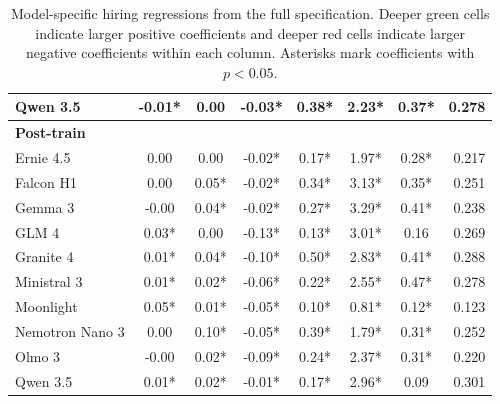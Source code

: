 \begin{table}[p]
\begin{tabular}{lccccccr}
Qwen 3.5 & \cellcolor[HTML]{FBE3E0}-0.01* & \cellcolor[HTML]{F4FCF8}0.00 & \cellcolor[HTML]{F9D6D2}-0.03* & \cellcolor[HTML]{60CE95}0.38* & \cellcolor[HTML]{71D3A0}2.23* & \cellcolor[HTML]{5ACC91}0.37* & 0.278 \\
\midrule
\multicolumn{8}{l}{\textbf{Post-train}} \\
Ernie 4.5 & \cellcolor[HTML]{F5FCF8}0.00 & \cellcolor[HTML]{F4FCF8}0.00 & \cellcolor[HTML]{FCE5E3}-0.02* & \cellcolor[HTML]{B7E9CF}0.17* & \cellcolor[HTML]{81D8AB}1.97* & \cellcolor[HTML]{80D7AA}0.28* & 0.217 \\
Falcon H1 & \cellcolor[HTML]{FDFEFE}0.00 & \cellcolor[HTML]{8ADBB1}0.05* & \cellcolor[HTML]{FADDDA}-0.02* & \cellcolor[HTML]{71D3A0}0.34* & \cellcolor[HTML]{38C17A}3.13* & \cellcolor[HTML]{61CE95}0.35* & 0.251 \\
Gemma 3 & \cellcolor[HTML]{FEF9F9}-0.00 & \cellcolor[HTML]{A4E3C2}0.04* & \cellcolor[HTML]{FADCD9}-0.02* & \cellcolor[HTML]{8DDCB3}0.27* & \cellcolor[HTML]{2EBE73}3.29* & \cellcolor[HTML]{48C684}0.41* & 0.238 \\
GLM 4 & \cellcolor[HTML]{A8E4C4}0.03* & \cellcolor[HTML]{FBFEFC}0.00 & \cellcolor[HTML]{E74C3C}-0.13* & \cellcolor[HTML]{C8EEDA}0.13* & \cellcolor[HTML]{40C37F}3.01* & \cellcolor[HTML]{B7E9CF}0.16 & 0.269 \\
Granite 4 & \cellcolor[HTML]{E3F6EC}0.01* & \cellcolor[HTML]{B2E7CB}0.04* & \cellcolor[HTML]{EC7165}-0.10* & \cellcolor[HTML]{2EBE73}0.50* & \cellcolor[HTML]{4BC787}2.83* & \cellcolor[HTML]{47C683}0.41* & 0.288 \\
Ministral 3 & \cellcolor[HTML]{D4F2E2}0.01* & \cellcolor[HTML]{DEF5E9}0.02* & \cellcolor[HTML]{F4ADA6}-0.06* & \cellcolor[HTML]{A3E2C1}0.22* & \cellcolor[HTML]{5DCD92}2.55* & \cellcolor[HTML]{2EBE73}0.47* & 0.278 \\
Moonlight & \cellcolor[HTML]{76D4A3}0.05* & \cellcolor[HTML]{ECF9F2}0.01* & \cellcolor[HTML]{F5B2AB}-0.05* & \cellcolor[HTML]{D4F2E2}0.10* & \cellcolor[HTML]{CBEFDC}0.81* & \cellcolor[HTML]{C8EEDA}0.12* & 0.123 \\
Nemotron Nano 3 & \cellcolor[HTML]{FBFEFD}0.00 & \cellcolor[HTML]{2EBE73}0.10* & \cellcolor[HTML]{F5B3AC}-0.05* & \cellcolor[HTML]{5ACC90}0.39* & \cellcolor[HTML]{8DDCB3}1.79* & \cellcolor[HTML]{76D4A3}0.31* & 0.252 \\
Olmo 3 & \cellcolor[HTML]{FFFCFC}-0.00 & \cellcolor[HTML]{CBEFDC}0.02* & \cellcolor[HTML]{ED7B70}-0.09* & \cellcolor[HTML]{99DFBB}0.24* & \cellcolor[HTML]{68D09A}2.37* & \cellcolor[HTML]{73D4A1}0.31* & 0.220 \\
Qwen 3.5 & \cellcolor[HTML]{D9F3E5}0.01* & \cellcolor[HTML]{DEF5E9}0.02* & \cellcolor[HTML]{FDEFED}-0.01* & \cellcolor[HTML]{B7E9CF}0.17* & \cellcolor[HTML]{43C481}2.96* & \cellcolor[HTML]{D7F3E4}0.09 & 0.301 \\
\hline
\end{tabular}
\caption{Model-specific hiring regressions from the full specification. Deeper green cells indicate larger positive coefficients and deeper red cells indicate larger negative coefficients within each column. Asterisks mark coefficients with $p < 0.05$.}
\label{tab:appendix-model-specific-regressions}
\end{table}
